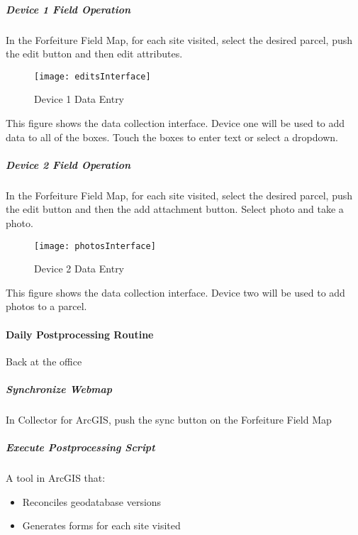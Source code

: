 \documentclass[class=article , crop=false, titlepage, twoside, multi={itemize, figure, verbatim}, float=false]{standalone}
\begin{document}
\clearpage
\subparagraph{Device 1 Field Operation}
\subparagraph*{}In the Forfeiture Field Map, for each site visited, select the desired parcel, push the edit button and then edit attributes.

\begin{wrapfigure}{r}{0.5\textwidth}
\centering
\texttt{[image: editsInterface]}
\caption {Device 1 Data Entry}
\end{wrapfigure}
\vspace{1in}

This figure shows the data collection interface.  Device one will be used to add data to all of the boxes.  Touch the boxes to enter text or select a dropdown.

\clearpage
\subparagraph{Device 2 Field Operation} 
\subparagraph*{}In the Forfeiture Field Map, for each site visited, select the desired parcel, push the edit button and then the add attachment button.  Select photo and take a photo.

\begin{wrapfigure}{l}{0.5\textwidth}
\centering
\texttt{[image: photosInterface]}
\caption {Device 2 Data Entry}
\end{wrapfigure}
\vspace{1in}

This figure shows the data collection interface.  Device two will be used to add photos to a parcel.

\clearpage
\paragraph{Daily Postprocessing Routine}Back at the office
\subparagraph{Synchronize Webmap}In Collector for ArcGIS, push the sync button on the Forfeiture Field Map
\subparagraph{Execute Postprocessing Script}A tool in ArcGIS that:

\begin{itemize}
\item Reconciles geodatabase versions
\item Generates forms for each site visited



\end{itemize}

\end{document}
